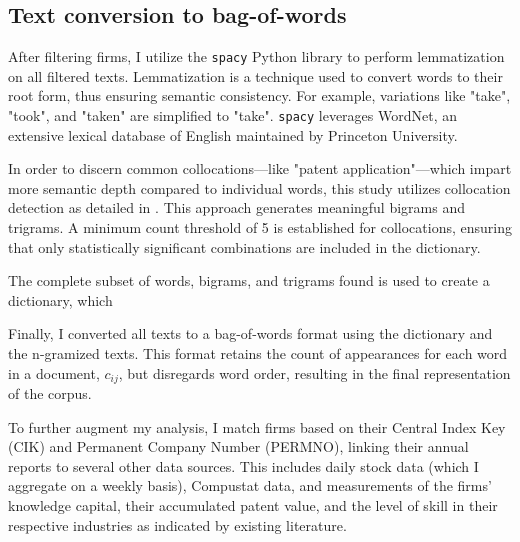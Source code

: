 \documentclass[12pt, letterpaper]{article}
\begin{document}
 

\subsection{Text conversion to bag-of-words}


After filtering firms, I utilize the \texttt{spacy} Python library to perform lemmatization on all filtered texts. Lemmatization is a technique used to convert words to their root form, thus ensuring semantic consistency. For example, variations like "take", "took", and "taken" are simplified to "take". \texttt{spacy} leverages WordNet, an extensive lexical database of English maintained by Princeton University.

In order to discern common collocations—like "patent application"—which impart more semantic depth compared to individual words, this study utilizes collocation detection as detailed in \cite{Mikolov2013-be}. This approach generates meaningful bigrams and trigrams. A minimum count threshold of 5 is established for collocations, ensuring that only statistically significant combinations are included in the dictionary.

The complete subset of words, bigrams, and trigrams found is used to create a dictionary, which 
 
Finally, I converted all texts to a bag-of-words format using the dictionary and the n-gramized texts. This format retains the count of appearances for each word in a document, $c_{ij}$, but disregards word order, resulting in the final representation of the corpus.

To further augment my analysis, I match firms based on their Central Index Key (CIK) and Permanent Company Number (PERMNO), linking their annual reports to several other data sources. This includes daily stock data (which I aggregate on a weekly basis), Compustat data, and measurements of the firms' knowledge capital, their accumulated patent value, and the level of skill in their respective industries as indicated by existing literature.

%
\end{document}
